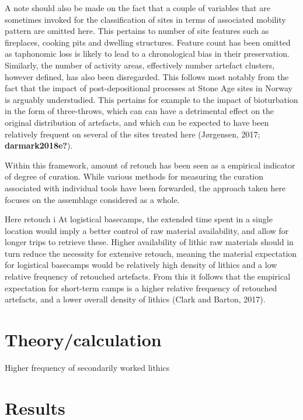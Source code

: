 \documentclass[
]{article}
\begin{document}
A note should also be made on the fact that a couple of variables that are sometimes invoked for the classification of sites in terms of associated mobility pattern are omitted here. This pertains to number of site features such as fireplaces, cooking pits and dwelling structures. Feature count has been omitted as taphonomic loss is likely to lead to a chronological bias in their preservation. Similarly, the number of activity areas, effectively number artefact clusters, however defined, has also been disregarded. This follows most notably from the fact that the impact of post-depositional processes at Stone Age sites in Norway is arguably understudied. This pertains for example to the impact of bioturbation in the form of three-throws, which can can have a detrimental effect on the original distribution of artefacts, and which can be expected to have been relatively frequent on several of the sites treated here (Jørgensen, 2017; \textbf{darmark2018e?}).

Within this framework, amount of retouch has been seen as a empirical indicator of degree of curation. While various methods for measuring the curation associated with individual tools have been forwarded, the approach taken here focuses on the assemblage considered as a whole.

Here retouch i At logistical basecamps, the extended time spent in a single location would imply a better control of raw material availability, and allow for longer trips to retrieve these. Higher availability of lithic raw materials should in turn reduce the necessity for extensive retouch, meaning the material expectation for logistical basecamps would be relatively high density of lithics and a low relative frequency of retouched artefacts. From this it follows that the empirical expectation for short-term camps is a higher relative frequency of retouched artefacts, and a lower overall density of lithics (Clark and Barton, 2017).

\hypertarget{theorycalculation}{%
\section{Theory/calculation}\label{theorycalculation}}

Higher frequency of secondarily worked lithics

\hypertarget{results}{%
\section{Results}\label{results}}
\end{document}
